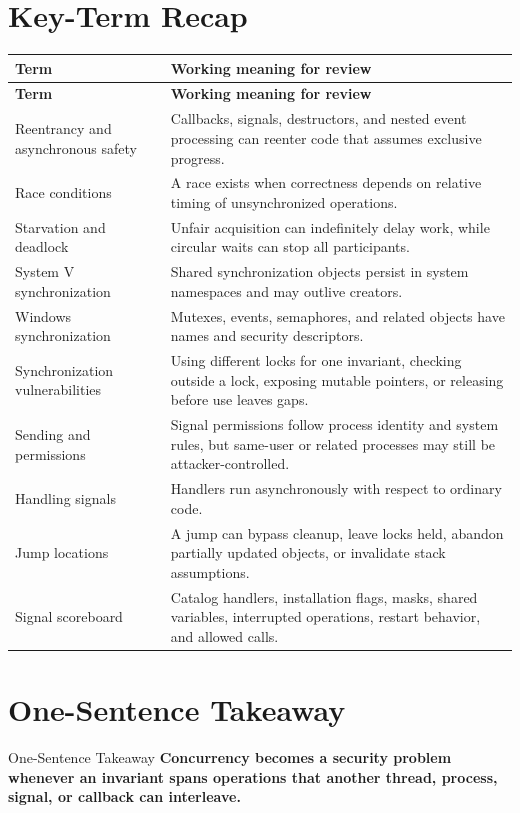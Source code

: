 \documentclass[11pt,letterpaper]{article}
\begin{document}
\section{Key-Term Recap}
\begin{longtable}{>{\raggedright\arraybackslash}p{}p{}}
\toprule
\textbf{Term} & \textbf{Working meaning for review} \\
\midrule
\endfirsthead
\toprule
\textbf{Term} & \textbf{Working meaning for review} \\
\midrule
\endhead
Reentrancy and asynchronous safety & Callbacks, signals, destructors, and nested event processing can reenter code that assumes exclusive progress. \\
Race conditions & A race exists when correctness depends on relative timing of unsynchronized operations. \\
Starvation and deadlock & Unfair acquisition can indefinitely delay work, while circular waits can stop all participants. \\
System V synchronization & Shared synchronization objects persist in system namespaces and may outlive creators. \\
Windows synchronization & Mutexes, events, semaphores, and related objects have names and security descriptors. \\
Synchronization vulnerabilities & Using different locks for one invariant, checking outside a lock, exposing mutable pointers, or releasing before use leaves gaps. \\
Sending and permissions & Signal permissions follow process identity and system rules, but same-user or related processes may still be attacker-controlled. \\
Handling signals & Handlers run asynchronously with respect to ordinary code. \\
Jump locations & A jump can bypass cleanup, leave locks held, abandon partially updated objects, or invalidate stack assumptions. \\
Signal scoreboard & Catalog handlers, installation flags, masks, shared variables, interrupted operations, restart behavior, and allowed calls. \\
\bottomrule
\end{longtable}
\section{One-Sentence Takeaway}
\begin{CornellExamBox}{One-Sentence Takeaway}
\textbf{Concurrency becomes a security problem whenever an invariant spans operations that another thread, process, signal, or callback can interleave.}
\end{CornellExamBox}
\end{document}
